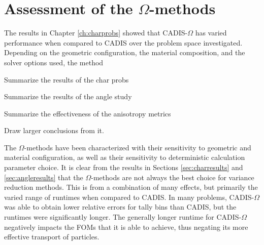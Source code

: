\section{Assessment of the $\Omega$-methods}
\label{sec:assessments}

The results in Chapter \ref{ch:charprobs} showed that CADIS-$\Omega$ has varied
performance when compared to CADIS over the problem space investigated.
Depending on the geometric configuration, the material composition, and the
solver options used, the method

Summarize the results of the char probs

Summarize the results of the angle study

Summarize the effectiveness of the anisotropy metrics

Draw larger conclusions from it.

The $\Omega$-methods have been characterized with their sensitivity to
geometric and material configuration, as well as their sensitivity to
deterministic calculation parameter choice. It is clear from the results in
Sections \ref{sec:charresults} and \ref{sec:angleresults} that the
$\Omega$-methods are not always the best choice for variance reduction methods.
This is from a combination of many effects, but primarily the varied range of
runtimes when compared to CADIS. In many problems, CADIS-$\Omega$ was able to
obtain lower relative errors for tally bins than CADIS, but the runtimes were
significantly longer. The generally longer runtime for CADIS-$\Omega$
negatively impacts the FOMs that it is able to achieve, thus negating its more
effective transport of particles.
